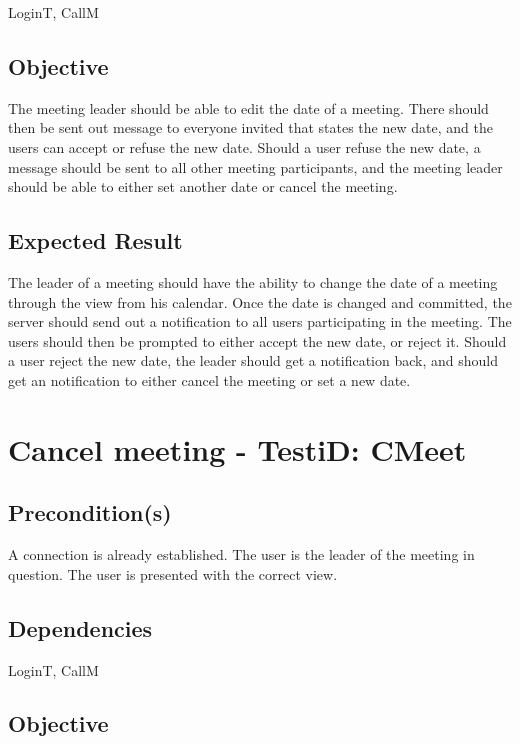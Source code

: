 \documentclass{article}
\begin{document}
LoginT, CallM

\subsection{Objective}

The meeting leader should be able to edit the date of a meeting. There
should then be sent out message to everyone invited that states the new
date, and the users can accept or refuse the new date. Should a user refuse
the new date, a message should be sent to all other meeting participants,
and the meeting leader should be able to either set another date or cancel
the meeting.

\subsection{Expected Result}

The leader of a meeting should have the ability to change the date of a
meeting through the view from his calendar. Once the date is changed and
committed, the server should send out a notification to all users
participating in the meeting. The users should then be prompted to either
accept the new date, or reject it. Should a user reject the new date, the
leader should get a notification back, and should get an notification to
either cancel the meeting or set a new date. \newpage

\section{Cancel meeting - TestiD: CMeet}

\subsection{Precondition(s)}

A connection is already established. The user is the leader of the meeting
in question. The user is presented with the correct view.

\subsection{Dependencies}

LoginT, CallM

\subsection{Objective}
\end{document}
